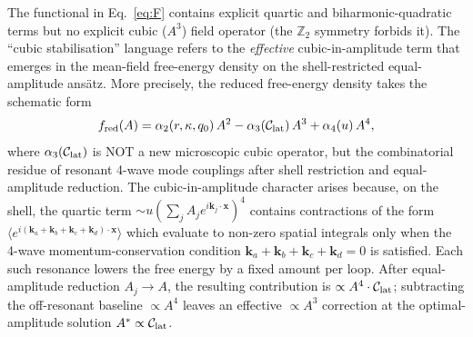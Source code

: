 \begin{remark}
\label{rem:cubic-effective}
The functional in Eq.~\eqref{eq:F} contains explicit quartic and
biharmonic-quadratic terms but no explicit cubic ($A^3$) field
operator (the $\mathbb{Z}_2$ symmetry forbids it). The
``cubic stabilisation'' language refers to the \emph{effective}
cubic-in-amplitude term that emerges in the mean-field free-energy
density on the shell-restricted equal-amplitude ans\"atz. More
precisely, the reduced free-energy density takes the schematic form
\begin{equation}
f_{\rm red}(A) = \alpha_2(r,\kappa,q_0)\, A^2
- \alpha_3(\mathcal{C}_{\rm lat})\, A^3
+ \alpha_4(u)\, A^4,
\label{eq:f-red}
\end{equation}
where $\alpha_3(\mathcal{C}_{\rm lat})$ is NOT a new microscopic cubic
operator, but the combinatorial residue of resonant 4-wave mode
couplings after shell restriction and equal-amplitude reduction. The
cubic-in-amplitude character arises because, on the shell, the
quartic term $\sim u (\sum_j A_j e^{i\mathbf{k}_j\cdot\mathbf{x}})^4$
contains contractions of the form
$\langle e^{i(\mathbf{k}_a + \mathbf{k}_b + \mathbf{k}_c +
\mathbf{k}_d)\cdot\mathbf{x}} \rangle$ which evaluate to non-zero
spatial integrals only when the 4-wave momentum-conservation condition
$\mathbf{k}_a + \mathbf{k}_b + \mathbf{k}_c + \mathbf{k}_d = 0$ is
satisfied. Each such resonance lowers the free energy by a fixed
amount per loop. After equal-amplitude reduction $A_j \to A$, the
resulting contribution is $\propto A^4 \cdot \mathcal{C}_{\rm lat}$;
subtracting the off-resonant baseline $\propto A^4$ leaves an
effective $\propto A^3$ correction at the optimal-amplitude solution
$A^* \propto \mathcal{C}_{\rm lat}$.
\end{remark}


